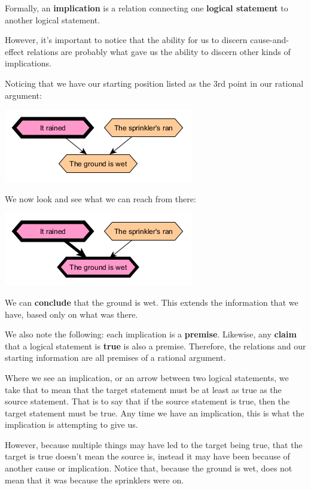 Formally, an \textbf{implication} is a relation connecting one \textbf{logical statement} to another logical statement.

However, it's important to notice that the ability for us to discern cause-and-effect relations are probably what gave us the ability to discern other kinds of implications.

Noticing that we have our starting position listed as the 3rd point in our rational argument:

\includegraphics{01/OrCase2.png}

We now look and see what we can reach from there:

\includegraphics{01/OrCase3.png}

We can \textbf{conclude} that the ground is wet. This extends the information that we have, based only on what was there.

We also note the following: each implication is a \textbf{premise}. Likewise, any \textbf{claim} that a logical statement is \textbf{true} is also a premise. Therefore, the relations and our starting information are all premises of a rational argument.

Where we see an implication, or an arrow between two logical statements, we take that to mean that the target statement must be at least as true as the source statement. That is to say that if the source statement is true, then the target statement must be true. Any time we have an implication, this is what the implication is attempting to give us. 

However, because multiple things may have led to the target being true, that the target is true doesn't mean the source is, instead it may have been because of another cause or implication. Notice that, because the ground is wet, does not mean that it was because the sprinklers were on.

